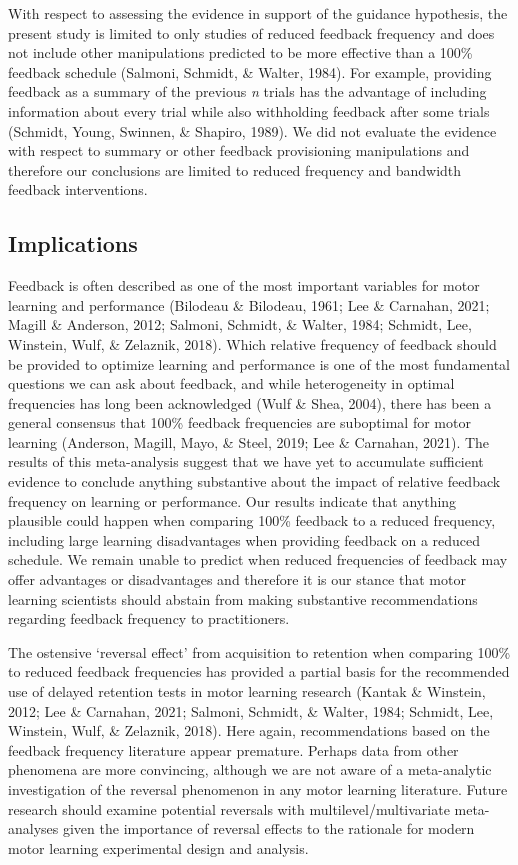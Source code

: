 \documentclass[
  english,
  man, donotrepeattitle,mask,floatsintext]{apa7}
\begin{document}
With respect to assessing the evidence in support of the guidance hypothesis, the present study is limited to only studies of reduced feedback frequency and does not include other manipulations predicted to be more effective than a 100\% feedback schedule (Salmoni, Schmidt, \& Walter, 1984). For example, providing feedback as a summary of the previous \emph{n} trials has the advantage of including information about every trial while also withholding feedback after some trials (Schmidt, Young, Swinnen, \& Shapiro, 1989). We did not evaluate the evidence with respect to summary or other feedback provisioning manipulations and therefore our conclusions are limited to reduced frequency and bandwidth feedback interventions.

\hypertarget{implications}{%
\subsection{Implications}\label{implications}}

Feedback is often described as one of the most important variables for motor learning and performance (Bilodeau \& Bilodeau, 1961; Lee \& Carnahan, 2021; Magill \& Anderson, 2012; Salmoni, Schmidt, \& Walter, 1984; Schmidt, Lee, Winstein, Wulf, \& Zelaznik, 2018). Which relative frequency of feedback should be provided to optimize learning and performance is one of the most fundamental questions we can ask about feedback, and while heterogeneity in optimal frequencies has long been acknowledged (Wulf \& Shea, 2004), there has been a general consensus that 100\% feedback frequencies are suboptimal for motor learning (Anderson, Magill, Mayo, \& Steel, 2019; Lee \& Carnahan, 2021). The results of this meta-analysis suggest that we have yet to accumulate sufficient evidence to conclude anything substantive about the impact of relative feedback frequency on learning or performance. Our results indicate that anything plausible could happen when comparing 100\% feedback to a reduced frequency, including large learning disadvantages when providing feedback on a reduced schedule. We remain unable to predict when reduced frequencies of feedback may offer advantages or disadvantages and therefore it is our stance that motor learning scientists should abstain from making substantive recommendations regarding feedback frequency to practitioners.

The ostensive `reversal effect' from acquisition to retention when comparing 100\% to reduced feedback frequencies has provided a partial basis for the recommended use of delayed retention tests in motor learning research (Kantak \& Winstein, 2012; Lee \& Carnahan, 2021; Salmoni, Schmidt, \& Walter, 1984; Schmidt, Lee, Winstein, Wulf, \& Zelaznik, 2018). Here again, recommendations based on the feedback frequency literature appear premature. Perhaps data from other phenomena are more convincing, although we are not aware of a meta-analytic investigation of the reversal phenomenon in any motor learning literature. Future research should examine potential reversals with multilevel/multivariate meta-analyses given the importance of reversal effects to the rationale for modern motor learning experimental design and analysis.
\end{document}
